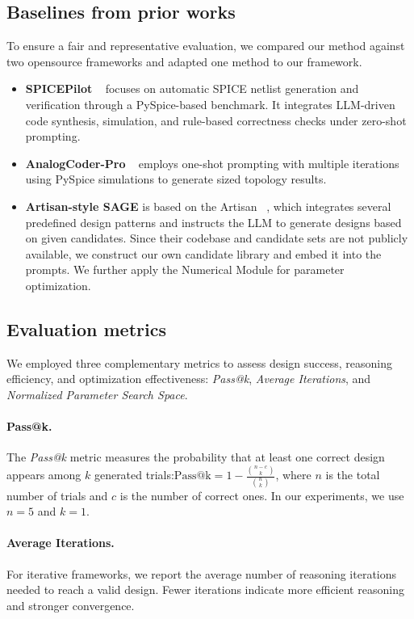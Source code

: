 \documentclass[sigconf,nonacm]{acmart}
\begin{document}
\subsection{Baselines from prior works}

To ensure a fair and representative evaluation, we compared our method against two opensource frameworks and adapted one method to our framework.


\begin{itemize}
    \item \textbf{SPICEPilot} ~\cite{vungarala2024spicepilot} focuses on automatic SPICE netlist generation and verification through a PySpice-based benchmark. It integrates LLM-driven code synthesis, simulation, and rule-based correctness checks under zero-shot prompting.
    \item \textbf{AnalogCoder-Pro} ~\cite{lai2025analogcoder} employs one-shot prompting with multiple iterations using PySpice simulations to generate sized topology results.
    \item \textbf{Artisan-style SAGE} is based on the Artisan ~\cite{chen2024artisan}, which integrates several predefined design patterns and instructs the LLM to generate designs based on given candidates. Since their codebase and candidate sets are not publicly available, we construct our own candidate library and embed it into the prompts. We further apply the Numerical Module for parameter optimization.
\end{itemize}
\subsection{Evaluation metrics}

We employed three complementary metrics to assess design success, reasoning efficiency, and optimization effectiveness: \textit{Pass@k}, \textit{Average Iterations}, and \textit{Normalized Parameter Search Space}.

\paragraph{Pass@k.}
The \textit{Pass@k} metric measures the probability that at least one correct design appears among $k$ generated trials:$\text{Pass@k} = 1 - \frac{\binom{n-c}{k}}{\binom{n}{k}}$,
where $n$ is the total number of trials and $c$ is the number of correct ones.
In our experiments, we use $n = 5$ and $k = 1$.

\paragraph{Average Iterations.}
For iterative frameworks, we report the average number of reasoning iterations needed to reach a valid design. Fewer iterations indicate more efficient reasoning and stronger convergence.
\end{document}
